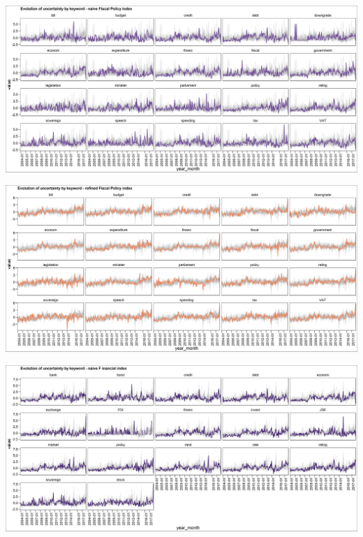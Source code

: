 \documentclass[11pt,preprint, authoryear]{elsarticle}
\let\origfigure\figure
\let\endorigfigure\endfigure
\renewenvironment{figure}[1][2] {
    \expandafter\origfigure\expandafter[H]
} {
    \endorigfigure
}
\numberwithin{equation}{section}
\numberwithin{figure}{section}
\numberwithin{table}{section}
\begin{document}
\begin{figure}
	\centering
	\includegraphics[width=\linewidth, keepaspectratio]{bin/fiscal_key_naive}\\
	
	\caption{Composite Fiscal Policy uncertainty naive index. \label{fig_fis_key_n}}
\end{figure}

\begin{figure}
	\centering
	\includegraphics[width=\linewidth, keepaspectratio]{bin/fiscal_key_refine}\\
	
	\caption{Composite Fiscal Policy uncertainty refined index. \label{fig_fis_key_r}}
\end{figure}

\begin{figure}
	\centering
	\includegraphics[width=\linewidth, keepaspectratio]{bin/financial_key_naive}\\
	
	\caption{Composite Financial market uncertainty naive index. \label{fig_fin_key_n}}
\end{figure}
\end{document}
